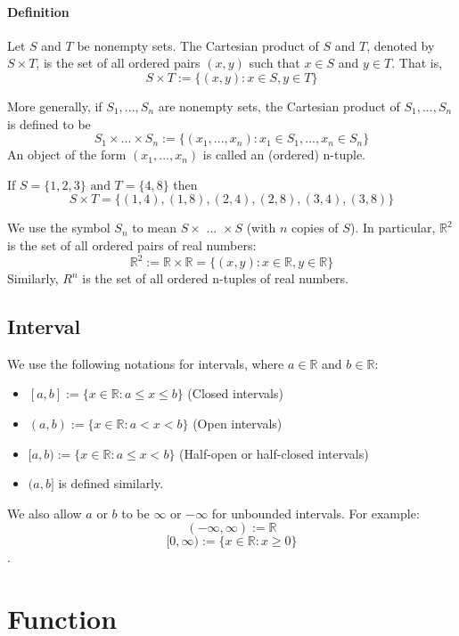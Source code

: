 \documentclass[12pt]{article}
\begin{document}
\paragraph{Definition} 
Let $S$ and $T$ be nonempty sets. The Cartesian product of $S$ and
$T$, denoted by $S \times T$, is the set of all ordered pairs $(x, y)$ such
that $x \in S$ and $y \in T$. That is,
\[S \times T := \{(x, y) : x \in S, y \in T\} \]

\noindent
More generally, if $S_1, ...,  S_n$ are nonempty sets, the Cartesian
product of $S_1, ..., S_n$ is defined to be
\[S_1 \times ... \times S_n := \{(x_1, ..., x_n) : x_1 \in S_1, ... , x_n \in S_n\} \]
An object of the form $(x_1, ... , x_n)$ is called an (ordered) n-tuple.

If $S = \{1, 2, 3\} \textrm{ and } T = \{4, 8\} $ then
\[S \times T = \{(1, 4), (1, 8), (2, 4), (2, 8), (3, 4), (3, 8)\} \]

We use the symbol $S_n$ to mean $S \times \textrm{ ... } \times S$ (with $n$ copies of
$S$). In particular, $\mathbb{R}^2$ is the set of all ordered pairs of real
numbers:
\[\mathbb{R}^2 := \mathbb{R} \times \mathbb{R} = \{(x, y) : x \in \mathbb{R}, y \in \mathbb{R}\} \]
Similarly, $R^n$ is the set of all ordered n-tuples of real numbers.

\subsection{Interval}
We use the following notations for intervals, where $a \in \mathbb{R}$ and
$b \in \mathbb{R}$:
\begin{itemize}
    \item $[a, b] :=\{x \in \mathbb{R} : a \leq x \leq b \}$ (Closed intervals)
    \item $(a, b) :=\{x \in \mathbb{R} : a < x < b \}$ (Open intervals)
    \item $[a, b):=\{x \in \mathbb{R} : a \leq x < b \}$ (Half-open or half-closed intervals)
    \item $(a, b]$ is defined similarly.
\end{itemize}

\noindent
We also allow $a$ or $b$ to be $\infty$ or $-\infty$ for unbounded intervals. 
For example: 
\[(-\infty, \infty) := \mathbb{R} \] 
\[[0, \infty) := \{x \in \mathbb{R} : x \geq 0 \}\].

\section{Function}
\end{document}
